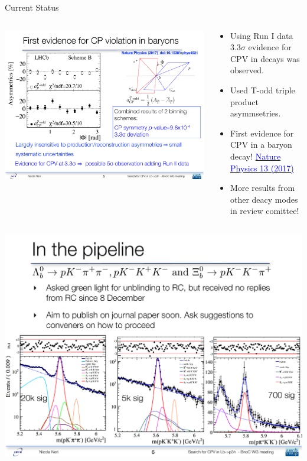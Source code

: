 \documentclass{beamer}
\begin{document}
\begin{frame}{Current Status}
  \small
  \begin{columns}
    \begin{column}{.4\textwidth}
      \includegraphics[width=\textwidth]{Run1CPV.pdf}
    \end{column}
    \begin{column}{.65\textwidth}
      \begin{itemize}
      \item Using Run I data $3.3\sigma$ evidence for CPV in \decay{\Lb}{\proton \pim\pip\pim} decays was observed.
      \item Used T-odd triple product asymmsetries.
      \item First evidence for CPV in a baryon decay! \href{http://www.nature.com/nphys/journal/v13/n4/full/nphys4021.html}{\textcolor{blue}{Nature Physics 13 (2017)}}
      \item More results from other deacy modes in review comittee!
      \end{itemize}
    \end{column}
  \end{columns}
  \begin{center}\includegraphics[width=.75\textwidth]{NewCPVChannels.pdf}\end{center}
\end{frame}
\end{document}
